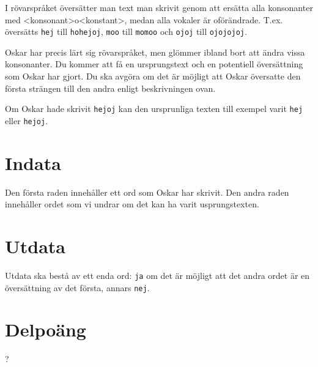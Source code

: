 I rövarspråket översätter man text man skrivit genom att ersätta alla konsonanter med <konsonant>o<konstant>, medan alla vokaler är oförändrade. T.ex. översätts \texttt{hej} till \texttt{hohejoj}, \texttt{moo} till \texttt{momoo} och \texttt{ojoj} till \texttt{ojojojoj}.

Oskar har precis lärt sig rövarspråket, men glömmer ibland bort att ändra vissa konsonanter. Du kommer att få en ursprungstext och en potentiell översättning som Oskar har gjort. Du ska avgöra om det är möjligt att Oskar översatte den första strängen till den andra enligt beskrivningen ovan.

Om Oskar hade skrivit \texttt{hejoj} kan den ursprunliga texten till exempel varit \texttt{hej} eller \texttt{hejoj}.

\section*{Indata}
Den första raden innehåller ett ord som Oskar har skrivit. Den andra raden innehåller ordet som vi undrar om det kan ha varit usprungstexten.

\section*{Utdata}
Utdata ska bestå av ett enda ord: \texttt{ja} om det är möjligt att det andra ordet är en översättning av det första, annars \texttt{nej}.

\section*{Delpoäng}
?
